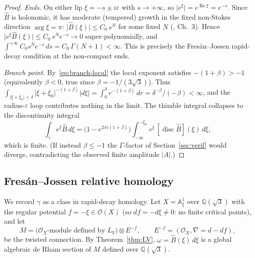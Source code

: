 \documentclass[11pt,reqno]{amsart}
\renewcommand{\_}{\vquadorigunderscore\allowbreak}
\theoremstyle{plain}
\theoremstyle{definition}
\newcommand{\Bhat}{\widehat{B}}
\newcommand{\LV}{L_{V}}
\newcommand{\Qsqrt}{\mathbb{Q}(\sqrt3)}
\newcommand{\xizero}{\xi_0}
\begin{document}
\begin{proof}
\emph{Ends.} On either lip $\xi=-s\pm i\varepsilon$ with $s\to+\infty$, so
$\lvert e^{\xi}\rvert=e^{\operatorname{Re}\xi}=e^{-s}$. Since $\Bhat$ is holonomic, it has
moderate (tempered) growth in the fixed non-Stokes direction $\arg\xi=\pi$: $\lvert\Bhat(\xi)\rvert
\le C_0\,s^{N}$ for some fixed $N$ (\cite{vdPS}, Ch.~3). Hence
$\lvert e^{\xi}\Bhat(\xi)\rvert\le C_0\,s^{N}e^{-s}\to0$ super-polynomially, and
$\int^{+\infty}C_0 s^N e^{-s}\,ds=C_0\,\Gamma(N+1)<\infty$. This is precisely the Fres\'an--Jossen
rapid-decay condition at the non-compact ends.

\emph{Branch point.} By~\eqref{eq:branch-local} the local exponent satisfies $-(1+\beta)>-1$
(equivalently $\beta<0$, true since $\beta=-1/(3\sqrt3)$). Thus
$\int_{\lvert\xi+\xizero\rvert<\delta}\lvert\xi+\xizero\rvert^{-(1+\beta)}\lvert d\xi\rvert
=\int_0^\delta r^{-(1+\beta)}\,dr=\delta^{-\beta}/(-\beta)<\infty$, and the radius-$\varepsilon$
loop contributes nothing in the limit. The thimble integral collapses to the discontinuity
integral
\begin{equation}\label{eq:disc}
  \int_\gamma e^{\xi}\Bhat\,d\xi
  =\bigl(1-e^{2\pi i(1+\beta)}\bigr)\int_{-\infty}^{-\xizero}e^{\xi}\,[\operatorname{disc}\Bhat](\xi)\,d\xi,
\end{equation}
which is finite. (If instead $\beta\le-1$ the $\Gamma$-factor of Section~\ref{sec:verif} would
diverge, contradicting the observed finite amplitude $\lvert A\rvert$.)
\end{proof}

\subsection{Fres\'an--Jossen relative homology}
We record $\gamma$ as a class in rapid-decay homology. Let $X=\mathbb{A}^1_\xi$ over $\Qsqrt$ with
the regular potential $f=-\xi\in\mathcal{O}(X)$ (so $df=-d\xi\ne0$: no finite critical points), and
let
\begin{equation}\label{eq:Mmotive}
  M=\bigl(\mathcal{O}_X\text{-module defined by }\LV\bigr)\otimes E^{-f},\qquad
  E^{-f}=(\mathcal{O}_X,\nabla=d-df),
\end{equation}
be the twisted connection. By Theorem~\ref{thm:LV}, $\omega=\Bhat(\xi)\,d\xi$ is a global algebraic
de Rham section of $M$ defined over $\Qsqrt$.
\end{document}
